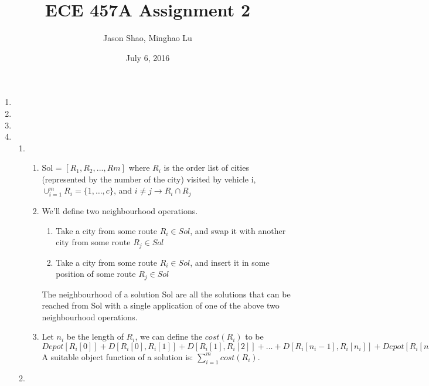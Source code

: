 \documentclass[12pt]{article}
\title{ECE 457A Assignment 2}
\author{Jason Shao, Minghao Lu}
\date{July 6, 2016}
\begin{document}
\maketitle
\newpage
\renewcommand{\thesubsection}{Problem \arabic{subsection}}


\def\question#1{\item[\bf #1.]}
\def\part#1{\item[\bf #1)]}
\newcommand{\pc}[1]{\mbox{\textbf{#1}}} %

\begin{enumerate}
    \item 
    \item
    \item
    \item
    \begin{enumerate}[label=(\alph*)]
        \item
            \begin{enumerate}[label=(\roman*)]
                \item Sol = $[R_1,R_2,...,Rm]$ where $R_i$ is the order list of cities
                    (represented by the number of the city) visited by vehicle i,
                    $\cup^{m}_{i=1}R_i=\{1,\dots,c\}$, and $i \neq j \rightarrow R_i \cap R_j$
                \item We'll define two neighbourhood operations.
                    \begin{enumerate}
                        \item Take a city from some route $R_i \in Sol$, and swap it with another city 
                            from some route $R_j \in Sol$
                        \item Take a city from some route $R_i \in Sol$, and insert it in some position
                            of some route $R_j \in Sol$
                    \end{enumerate}
                    The neighbourhood of a solution Sol are all the solutions that can be reached
                    from Sol with a single application of one of the above two neighbourhood operations.
                \item Let $n_i$ be the length of $R_i$, we can define the $cost(R_i)$ to be
                $Depot[R_i[0]] + D[R_i[0], R_i[1]] + D[R_i[1],R_i[2]] + \dots + D[R_i[n_i-1],R_i[n_i]]+ Depot[R_i[n_i]]$
                A suitable object function of a solution is: $\sum^{m}_{i=1}cost(R_i)$.
            \end{enumerate}
        \item

    \end{enumerate}

\end{enumerate}
\end{document}

